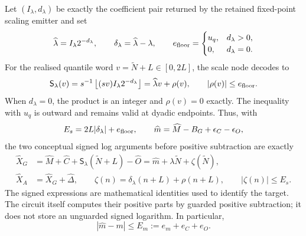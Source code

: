 \documentclass[11pt]{article}
\begin{document}
Let $(I_\lambda,d_\lambda)$ be exactly the coefficient pair returned by
the retained fixed-point scaling emitter and set
\begin{equation}
 \widehat\lambda=I_\lambda 2^{-d_\lambda},
 \qquad \delta_\lambda=\widehat\lambda-\lambda,
 \qquad
 e_{\rm floor}=\begin{cases}u_q,&d_\lambda>0,\\0,&d_\lambda=0.\end{cases}
\end{equation}
For the realised quantile word $v=\widetilde N+L\in[0,2L]$, the scale
node decodes to
\begin{equation}
 \mathsf S_\lambda(v)
 =s^{-1}\left\lfloor (sv)I_\lambda 2^{-d_\lambda}\right\rfloor
 =\widehat\lambda v+\rho(v),
 \qquad |\rho(v)|\leq e_{\rm floor}.
\end{equation}
When $d_\lambda=0$, the product is an integer and $\rho(v)=0$ exactly.
The inequality with $u_q$ is outward and remains valid at dyadic endpoints.
Thus, with
\begin{equation}
 E_s=2L|\delta_\lambda|+e_{\rm floor},\qquad
 \widehat m=\widehat M-B_G+\epsilon_C-\epsilon_O,
\end{equation}
the two conceptual signed log arguments before positive subtraction are
exactly
\begin{align}
 \widehat X_G
 &=\widehat M+\widehat C+
     \mathsf S_\lambda(\widetilde N+L)-\widehat O
   =\widehat m+\lambda\widetilde N+\zeta(\widetilde N),\\
 \widehat X_A
 &=\widehat X_G+\widehat\Delta,
 \qquad
 \zeta(n)=\delta_\lambda(n+L)+\rho(n+L),
 \qquad |\zeta(n)|\leq E_s.
\end{align}
The signed expressions are mathematical identities used to identify the
target. The circuit itself computes their positive parts by guarded
positive subtraction; it does not store an unguarded signed logarithm.
In particular,
\begin{equation}
 |\widehat m-m|\leq E_m:=e_m+e_C+e_O.
\end{equation}
\end{document}
